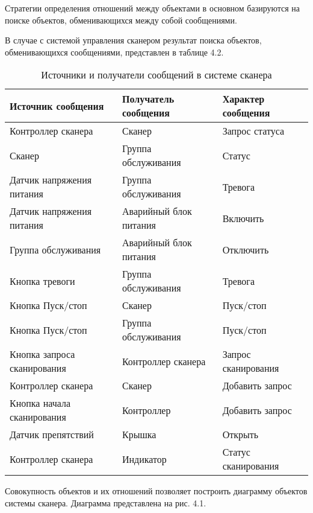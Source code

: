 \documentclass[12pt]{article}
\begin{document}
    Стратегии определения отношений между объектами в основном базируются на поиске объектов, обменивающихся между собой сообщениями.

    В случае с системой управления сканером результат поиска объектов, обменивающихся сообщениями, представлен в таблице 4.2.

    \begin{table}[h!]
        \centering
        \begin{tabulary}{\textwidth}{|L|L|L|}
            \hline
            Источник сообщения & Получатель сообщения & Характер сообщения \\
            \hline
            Контроллер сканера & Сканер & Запрос статуса \\
            \hline
            Сканер & Группа обслуживания & Статус \\
            \hline
            Датчик напряжения питания & Группа обслуживания & Тревога \\
            \hline
            Датчик напряжения питания & Аварийный блок питания & Включить \\
            \hline
            Группа обслуживания & Аварийный блок питания & Отключить \\
            \hline
            Кнопка тревоги & Группа обслуживания & Тревога \\
            \hline
            Кнопка Пуск/стоп & Сканер & Пуск/стоп \\
            \hline
            Кнопка Пуск/стоп & Группа обслуживания & Пуск/стоп \\
            \hline
            Кнопка запроса сканирования & Контроллер сканера & Запрос сканирования \\
            \hline
            Контроллер сканера & Сканер & Добавить запрос \\
            \hline
            Кнопка начала сканирования & Контроллер & Добавить запрос \\
            \hline
            Датчик препятствий & Крышка & Открыть \\
            \hline
            Контроллер сканера & Индикатор & Статус сканирования \\
            \hline
        \end{tabulary}
        \caption{Источники и получатели сообщений в системе сканера}
    \end{table}

    \newpage

    Совокупность объектов и их отношений позволяет построить диаграмму объектов системы сканера. Диаграмма представлена на рис. 4.1.
\end{document}
